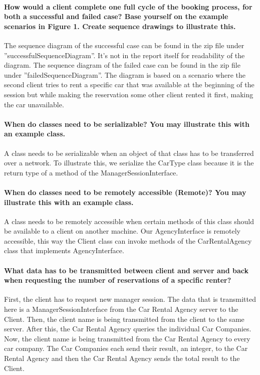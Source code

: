 \documentclass{ds-report}
\begin{document}
	\maketitle

	\paragraph{How would a client complete one full cycle of the booking process, for both a successful and
failed case? Base yourself on the example scenarios in Figure 1. Create sequence drawings to
illustrate this.\\} 
The sequence diagram of the successful case can be found in the zip file under ''successfulSequenceDiagram''. It's not in the report itself for readability of the diagram. The sequence diagram of the failed case can be found in the zip file under ''failedSequenceDiagram''. The diagram is based on a scenario where the second client tries to rent a specific car that was available at the beginning of the session but while making the reservation some other client rented it first, making the car unavailable.

	
	\paragraph{When do classes need to be serializable? You may illustrate this with an example class.\\} 
	A class needs to be serializable when an object of that class has to be transferred over a network. To illustrate this, we serialize the CarType class because it is the return type of a method of the ManagerSessionInterface.
	
	\paragraph{When do classes need to be remotely accessible (Remote)? You may illustrate this with  an example class.\\} 
	A class needs to be remotely accessible when certain methods of this class should be available to a client on another machine.
	Our AgencyInterface is remotely accessible, this way the Client class can invoke methods of the CarRentalAgency class that implements AgencyInterface.
	
	\paragraph{What data has to be transmitted between client and server and back when requesting the number
of reservations of a specific renter?\\}
	First, the client has to request new manager session.
	The data that is transmitted here is a ManagerSessionInterface from the Car Rental Agency server to the Client.
	Then, the client name is being transmitted from the client to the same server.
	After this, the Car Rental Agency queries the individual Car Companies. Now, the client name is being transmitted from the Car Rental Agency to every car company.
	The Car Companies each send their result, an integer, to the Car Rental Agency and then the Car Rental Agency sends the total result to the Client.
	
\end{document}
